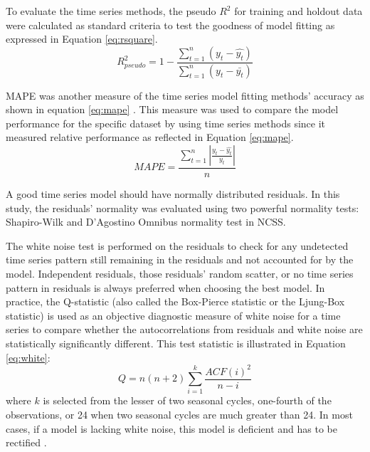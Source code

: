 To evaluate the time series methods, the pseudo $R^2$ for training and holdout data were calculated as standard criteria to test the goodness of model fitting as expressed in Equation \ref{eq:rsquare}.
\begin{equation}
	\label{eq:rsquare}
	R_{pseudo}^2=1-\frac{\sum_{t=1}^{n}(y_t-\hat{y_t})}{\sum_{t=1}^{n}(y_t-\bar{y_t})}
\end{equation}

MAPE was another measure of the time series model fitting methods' accuracy as shown in equation \ref{eq:mape} \citep{Hanke1998, Bowerman2005}. This measure was used to compare the model performance for the specific dataset by using time series methods since it measured relative performance \citep{Chu1998} as reflected in Equation \ref{eq:mape}.
\begin{equation}
	\label{eq:mape}
	MAPE=\frac{\sum_{t=1}^{n}\left | \frac{y_t-\hat{y_t}}{y_t} \right |}{n}
\end{equation}

A good time series model should have normally distributed residuals. In this study, the residuals' normality was evaluated using two powerful normality tests: Shapiro-Wilk \citep{Shapiro1965} and D'Agostino Omnibus normality test \citep{d1990} in NCSS.

The white noise test is performed on the residuals to check for any undetected time series pattern still remaining in the residuals and not accounted for by the model. Independent residuals, those residuals' random scatter, or no time series pattern in residuals  \citep{Weisent2010} is always preferred when choosing the best model. In practice, the Q-statistic (also called the Box-Pierce statistic or the Ljung-Box statistic) is used as an objective diagnostic measure of white noise for a time series to compare whether the autocorrelations from residuals and white noise are statistically significantly different. This test statistic is illustrated in Equation \ref{eq:white}:
\begin{equation}
	\label{eq:white}
	Q=n(n+2)\sum_{i=1}^k{\frac{ACF(i)^2}{n-i}}
\end{equation}
where $k$ is selected from the lesser of two seasonal cycles, one-fourth of the observations, or 24 when two seasonal cycles are much greater than 24. In most cases, if a model is lacking white noise, this model is deficient and has to be rectified \citep{de1998}. 
